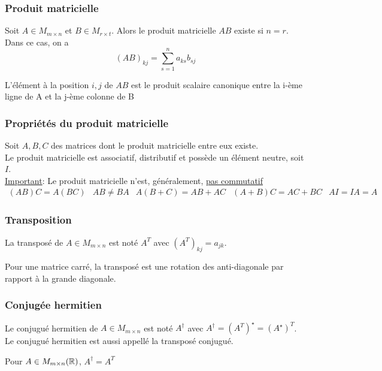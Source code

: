 \subsubsection{Produit matricielle}
\noindent
Soit $A \in M_{m \times n}$ et $B \in M_{r \times t}$. Alors
le produit matricielle $AB$ existe si $n = r$. Dans ce cas, on a \[
    (AB)_{kj} = \sum_{s = 1}^{n} a_{ks} b_{sj}
\]
\begin{remark}
    L'élément à la position $i, j$ de $AB$ est le produit scalaire canonique entre la i-ème ligne
    de A et la j-ème colonne de B
\end{remark}

\subsubsection{Propriétés du produit matricielle}
\noindent
Soit $A, B, C$ des matrices dont le produit matricielle entre eux existe. \\
Le produit matricielle est associatif, distributif et possède un élément neutre, soit $I$. \\
\underline{Important}: Le produit matricielle n'est, généralement, \underline{pas commutatif}
\[
    \begin{matrix}
        (AB)C = A(BC) & AB \neq BA & A(B + C) = AB + AC & (A + B)C = AC + BC & AI = IA = A
    \end{matrix}
\]

\subsubsection{Transposition}
\begin{definition}
    La transposé de $A \in M_{m \times n}$ est noté $A^T$ avec $\left(A^T\right)_{kj} = a_{jk}$.
    \begin{remark}
        Pour une matrice carré, la transposé est une rotation des anti-diagonale par rapport à la grande diagonale.
    \end{remark}
\end{definition}

\subsubsection{Conjugée hermitien}
\begin{definition}
    Le conjugué hermitien de $A \in M_{m \times n}$ est noté $A^\dagger$ avec $A^\dagger = \left(A^T\right)^\star = \left(A^\star\right)^T$.
    Le conjugué hermitien est aussi appellé la transposé conjugué.
    \begin{remark}
        Pour $A \in M_{m \times n}(\mathbb{R})$, $A^\dagger = A^T$
    \end{remark}
\end{definition}

